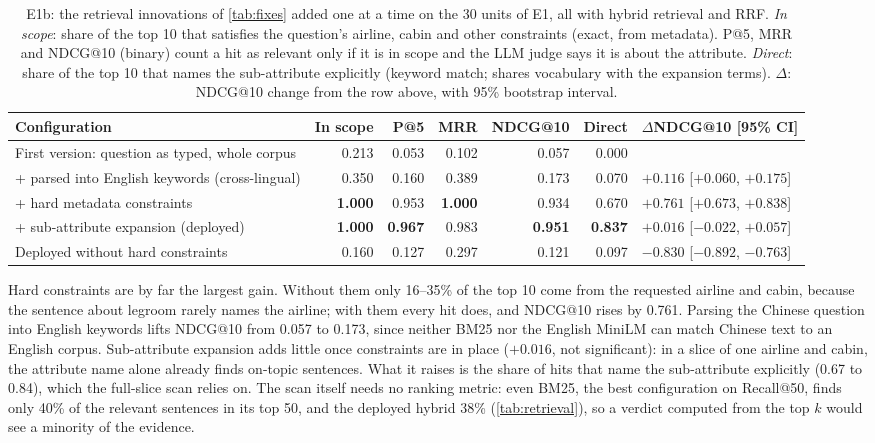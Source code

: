 \documentclass[10pt,twocolumn,a4paper]{article}
\newcommand{\best}[1]{\textbf{#1}}
\begin{document}
\begin{table}[t]
\centering\small
\caption{E1b: the retrieval innovations of \cref{tab:fixes} added one at a time on the 30 units of E1, all with hybrid
retrieval and RRF. \emph{In scope}: share of the top 10 that satisfies the question's airline, cabin and other
constraints (exact, from metadata). P@5, MRR and NDCG@10 (binary) count a hit as relevant only if it is in scope and
the LLM judge says it is about the attribute. \emph{Direct}: share of the top 10 that names the sub-attribute
explicitly (keyword match; shares vocabulary with the expansion terms). $\Delta$: NDCG@10 change from the row above, with 95\%
bootstrap interval.}
\label{tab:innov}
\begin{tabular}{@{}lrrrrrl@{}}
\toprule
\textbf{Configuration} & \textbf{In scope} & \textbf{P@5} & \textbf{MRR} & \textbf{NDCG@10} & \textbf{Direct} & \textbf{$\Delta$NDCG@10 [95\% CI]} \\
\midrule
First version: question as typed, whole corpus & 0.213 & 0.053 & 0.102 & 0.057 & 0.000 & \\
+ parsed into English keywords (cross-lingual) & 0.350 & 0.160 & 0.389 & 0.173 & 0.070 & $+0.116$ [$+0.060$, $+0.175$] \\
+ hard metadata constraints & \best{1.000} & 0.953 & \best{1.000} & 0.934 & 0.670 & $+0.761$ [$+0.673$, $+0.838$] \\
\rowcolor{shade} + sub-attribute expansion (deployed) & \best{1.000} & \best{0.967} & 0.983 & \best{0.951} & \best{0.837} & $+0.016$ [$-0.022$, $+0.057$] \\
\midrule
Deployed without hard constraints & 0.160 & 0.127 & 0.297 & 0.121 & 0.097 & $-0.830$ [$-0.892$, $-0.763$] \\
\bottomrule
\end{tabular}
\end{table}

Hard constraints are by far the largest gain. Without them only 16--35\% of the top 10 come from the requested airline
and cabin, because the sentence about legroom rarely names the airline; with them every hit does, and NDCG@10 rises by
0.761. Parsing the Chinese question into English keywords lifts NDCG@10 from 0.057 to 0.173, since neither BM25 nor
the English MiniLM can match Chinese text to an English corpus. Sub-attribute expansion adds little once constraints
are in place ($+0.016$, not significant): in a slice of one airline and cabin, the attribute name alone already finds
on-topic sentences. What it raises is the share of hits that name the sub-attribute explicitly (0.67 to 0.84), which
the full-slice scan relies on. The scan itself needs no ranking metric: even BM25, the best configuration on Recall@50,
finds only 40\% of the relevant sentences in its top 50, and the deployed hybrid 38\% (\cref{tab:retrieval}), so a
verdict computed from the top $k$ would see a minority of the evidence.
\end{document}
